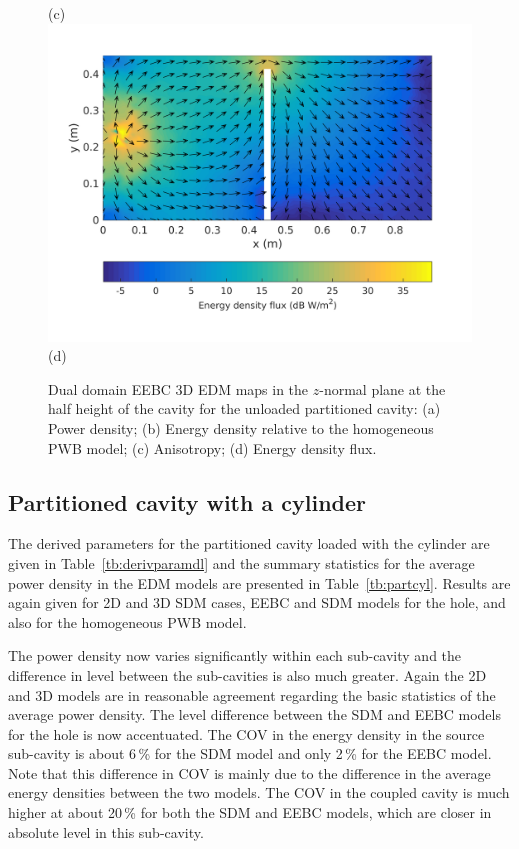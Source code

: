\documentclass[a4paper]{article}
\numberwithin{equation}{section}
\newcounter{Table}
\begin{document}
\begin{figure}[hp]
\begin{center}
{\footnotesize (c)}\\
\vspace{2mm}
\includegraphics[trim={0 8mm 0 12mm},clip,width=0.52\linewidth]{figures/DDM-EEBC_3D_DU_EnergyDensityFluxMap}\\
{\footnotesize (d)}\\
\vspace{-2mm}
\caption{\label{fg:partemptyddm_maps} Dual domain EEBC 3D EDM maps in the $z$-normal plane at the half height of the cavity for the 
unloaded partitioned cavity: (a) Power density; (b) Energy density relative to the homogeneous PWB model;
(c) Anisotropy; (d) Energy density flux.}
\end{center}
\end{figure}

\subsection[Partitioned cavity with a cylinder]{Partitioned cavity with a cylinder}
\label{sc:res:cylpart}

The derived parameters for the partitioned cavity loaded with the cylinder are given in Table~\ref{tb:derivparamdl} 
and the summary statistics for the average power density in the EDM models are presented in Table~\ref{tb:partcyl}. 
Results are again given for 2D and 3D SDM cases, EEBC and SDM models for the hole, and also for the homogeneous 
PWB model. 

The power density now varies significantly within each sub-cavity and the difference in level between the sub-cavities is
also much greater. Again the 2D and 3D models are in reasonable agreement regarding the basic statistics of the 
average power density. The level difference between the SDM and EEBC models for the hole is now accentuated. 
The COV in the energy density in the source sub-cavity is about 6\,\% for the SDM model and only 2\,\% for the EEBC model.
Note that this difference in COV is mainly due to the difference in the average energy densities between the two
models. The COV in the coupled cavity is much higher at about 20\,\% for both the SDM and EEBC models, which are
closer in absolute level in this sub-cavity.
\end{document}
